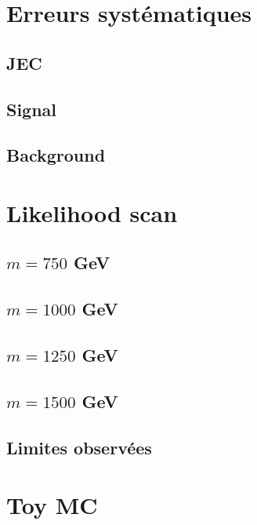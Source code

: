 \documentclass[twoside,12pt]{article}
\begin{document}
\section{Erreurs systématiques}
\subsection{JEC}

\subsection{Signal}

\subsection{Background}

\section{Likelihood scan}

\subsection{$m = 750$ GeV}


\subsection{$m = 1000$ GeV}


\subsection{$m = 1250$ GeV}


\subsection{$m = 1500$ GeV}


\subsection{Limites observées}


\section{Toy MC}

\end{document}
